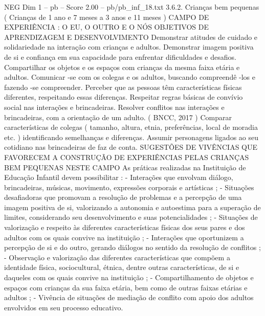 \begin{textsample}{NEG Dim 1 – pb – Score 2.00 – pb/pb\_inf\_18.txt}  \label{ex:f1_neg_145}
3.6.2.
Crianças bem pequenas ( Crianças de 1 ano e 7 meses a 3 anos e 11 meses ) CAMPO DE EXPERIÊNCIA : O EU, O OUTRO E O NÓS OBJETIVOS DE APRENDIZAGEM E DESENVOLVIMENTO Demonstrar atitudes de cuidado e solidariedade na interação com crianças e adultos.
Demonstrar imagem positiva de si e confiança em sua capacidade para enfrentar dificuldades e desafios.
Compartilhar os objetos e os espaços com crianças da mesma faixa etária e adultos.
Comunicar -se com os colegas e os adultos, buscando compreendê -los e fazendo -se compreender.
Perceber que as pessoas têm características físicas diferentes, respeitando essas diferenças.
Respeitar regras básicas de convívio social nas interações e brincadeiras.
Resolver conflitos nas interações e brincadeiras, com a orientação de um adulto. ( BNCC, 2017 ) Comparar características de colegas ( tamanho, altura, etnia, preferências, local de moradia etc. ) identificando semelhanças e diferenças.
Assumir personagens ligados ao seu cotidiano nas brincadeiras de faz de conta.
SUGESTÕES DE VIVÊNCIAS QUE FAVORECEM A CONSTRUÇÃO DE EXPERIÊNCIAS PELAS CRIANÇAS BEM PEQUENAS NESTE CAMPO As práticas realizadas na Instituição de Educação Infantil devem possibilitar : - Interações que envolvam diálogo, brincadeiras, músicas, movimento, expressões corporais e artísticas ; - Situações desafiadoras que promovam a resolução de problemas e a percepção de uma imagem positiva de si, valorizando a autonomia e autoestima para a superação de limites, considerando seu desenvolvimento e suas potencialidades ; - Situações de valorização e respeito às diferentes características físicas dos seus pares e dos adultos com os quais convive na instituição ; - Interações que oportunizem a percepção de si e do outro, gerando diálogos no sentido da resolução de conflitos ; - Observação e valorização das diferentes características que compõem a identidade física, sociocultural, étnica, dentre outras características, de si e daqueles com os quais convive na instituição ; - Compartilhamento de objetos e espaços com crianças da sua faixa etária, bem como de outras faixas etárias e adultos ; - Vivência de situações de mediação de conflito com apoio dos adultos envolvidos em seu processo educativo.

\end{textsample}
